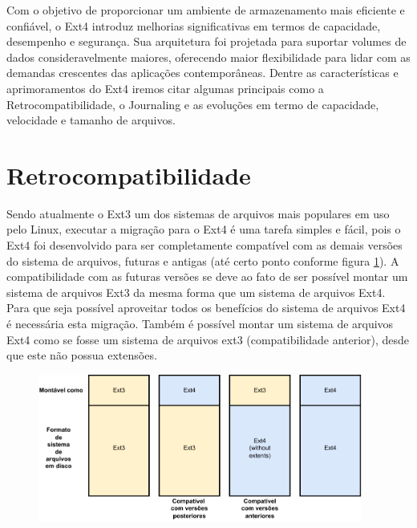 \documentclass[
	12pt,				%
	openright,			%
	oneside,			%
	a4paper,			%
	chapter=TITLE,		%
	english,			%
	french,				%
	spanish,			%
	brazil				%
	]{abntex2}
\theoremstyle{definition}
\begin{document}
Com o objetivo de proporcionar um ambiente de armazenamento mais eficiente e confiável, o 
Ext4 introduz melhorias significativas em termos de capacidade, desempenho e segurança. 
Sua arquitetura foi projetada para suportar volumes de dados consideravelmente maiores, 
oferecendo maior flexibilidade para lidar com as demandas crescentes das aplicações contemporâneas. 
Dentre as características e aprimoramentos do Ext4 iremos citar algumas principais como a Retrocompatibilidade,
o Journaling e as evoluções em termo de capacidade, velocidade e tamanho de arquivos.


\section{Retrocompatibilidade}

Sendo atualmente o Ext3 um dos sistemas de arquivos mais populares em uso pelo Linux, executar a migração para o Ext4 é 
uma tarefa simples e fácil, pois o Ext4 foi desenvolvido para ser completamente compatível com as demais versões do sistema 
de arquivos, futuras e antigas (até certo ponto conforme figura \ref{fig:3-4}). A compatibilidade com as futuras versões se deve ao 
fato de ser possível montar um sistema de arquivos Ext3 da mesma forma que um sistema de arquivos Ext4. Para que seja possível 
aproveitar todos os benefícios do sistema de arquivos Ext4 é necessária esta migração. Também é possível montar um sistema de 
arquivos Ext4 como se fosse um sistema de arquivos ext3 (compatibilidade anterior), desde que este não possua extensões.



\begin{figure}[H]
	\centering
	\includegraphics[width=0.95\textwidth]{3-4.pdf}
	\caption{}
	\label{fig:3-4}
\end{figure}
\end{document}
